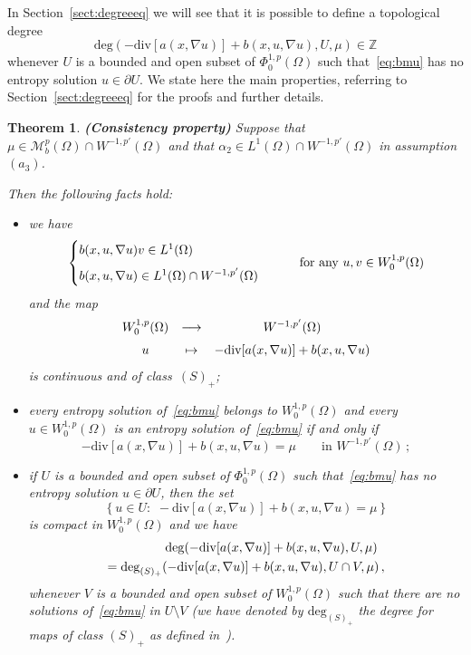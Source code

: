 \documentclass[twoside,reqno]{amsart}
\numberwithin{equation}{section}
\newtheorem{thm}{Theorem}[section]
\theoremstyle{definition}
\newcommand{\Z}{\mathbb{Z}}
\begin{document}
%
In Section~\ref{sect:degreeeq} we will see that it is possible
to define a topological degree
\[
\mathrm{deg}(- \mathrm{div}[a(x,\nabla u)] 
+ b(x,u,\nabla u),U,\mu)\in \Z
\]
whenever $U$ is a bounded and open subset of $\Phi^{1,p}_0(\Omega)$
such that~\eqref{eq:bmu} has no entropy solution $u\in\partial U$.
We state here the main properties, referring to 
Section~\ref{sect:degreeeq} for the proofs and further details.
%
\begin{thm}
\label{thm:consistency}
\textbf{\emph{(Consistency property)}}
Suppose that 
$\mu\in\mathcal{M}_b^p(\Omega)\cap W^{-1,p'}(\Omega)$ and that
$\alpha_2\in L^1(\Omega)\cap W^{-1,p'}(\Omega)$ in 
assumption~$(a_3)$.
\par
Then the following facts hold:
\begin{itemize}
\item[$(a)$]
we have
\[
\begin{cases}
b(x,u,\nabla u)v\in L^1(\Omega) \\
\noalign{\medskip}
b(x,u,\nabla u)\in L^1(\Omega)\cap W^{-1,p'}(\Omega) 
\end{cases}
\qquad\text{for any $u,v\in W^{1,p}_0(\Omega)$}
\]
and the map
\[
\begin{array}{ccc}
W^{1,p}_0(\Omega) & \longrightarrow & W^{-1,p'}(\Omega) \\
\noalign{\medskip}
u & \mapsto & -\mathrm{div}[a(x,\nabla u)]+b(x,u,\nabla u)
\end{array}
\]
is continuous and of class~$(S)_+$;
\item[$(b)$]
every entropy solution of~\eqref{eq:bmu} belongs to 
$W^{1,p}_0(\Omega)$ and every $u\in W^{1,p}_0(\Omega)$
is an entropy solution of~\eqref{eq:bmu} if and only if
\[
- \mathrm{div}[a(x,\nabla u)] + b(x,u,\nabla u)=\mu
\qquad\text{in $W^{-1,p'}(\Omega)$}\,;
\]
\item[$(c)$]
if $U$ is a bounded and open subset of $\Phi^{1,p}_0(\Omega)$
such that~\eqref{eq:bmu} has no entropy solution  
$u\in\partial U$, then the set
\[
\left\{u\in U:\,\,
- \mathrm{div}[a(x,\nabla u)] + b(x,u,\nabla u)=\mu\right\}
\]
is compact in $W^{1,p}_0(\Omega)$ and we have
\begin{multline*}
\null\qquad\qquad
\mathrm{deg}(- \mathrm{div}[a(x,\nabla u)] 
+ b(x,u,\nabla u),U,\mu) \\
= \mathrm{deg}_{(S)_+}(- \mathrm{div}[a(x,\nabla u)] 
+ b(x,u,\nabla u),U\cap V,\mu)\,,
\end{multline*}
whenever $V$ is a bounded and open subset of $W^{1,p}_0(\Omega)$
such that there are no solutions of~\eqref{eq:bmu}
in $U\setminus V$ (we have denoted by $\mathrm{deg}_{(S)_+}$ 
the degree for maps of class $(S)_+$ as defined
in~\cite{browder1983, oregan_cho_chen2006, skrypnik1994}).
\end{itemize}
\end{thm}
\end{document}
